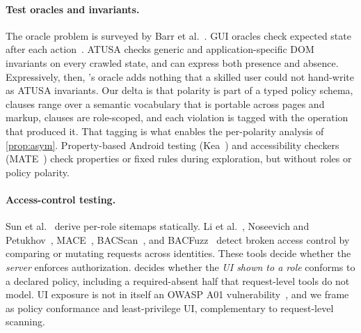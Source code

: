 \paragraph{Test oracles and invariants.}
The oracle problem is surveyed by Barr et al.~\cite{barr2015oracle}. GUI
oracles check expected state after each action~\cite{memon2000oracles}. ATUSA
\cite{mesbah2012invariant} checks generic and application-specific DOM
invariants on every crawled state, and can express both presence and absence.
Expressively, then, \sys{}'s oracle adds nothing that a skilled user could not
hand-write as ATUSA invariants. Our delta is that polarity is part of a typed
policy schema, clauses range over a semantic vocabulary that is portable
across pages and markup, clauses are role-scoped, and each violation is tagged
with the operation that produced it. That tagging is what enables the
per-polarity analysis of \cref{prop:asym}. Property-based Android testing
(Kea~\cite{xiong2024kea}) and accessibility checkers (MATE~\cite{eler2018mate})
check properties or fixed rules during exploration, but without roles or
policy polarity.

\paragraph{Access-control testing.}
Sun et al.~\cite{sun2011static} derive per-role sitemaps statically. Li et
al.~\cite{li2014blackbox}, Noseevich and Petukhov~\cite{noseevich2011detecting},
MACE~\cite{monshizadeh2014mace}, BACScan~\cite{liu2025bacscan}, and
BACFuzz~\cite{dharmaadi2025bacfuzz} detect broken access control by comparing
or mutating requests across identities. These tools decide whether the
\emph{server} enforces authorization. \sys{} decides whether the \emph{UI shown
to a role} conforms to a declared policy, including a required-absent half
that request-level tools do not model. UI exposure is not in itself an OWASP
A01 vulnerability~\cite{owasp2021a01}, and we frame \sys{} as policy
conformance and least-privilege UI, complementary to request-level scanning.

